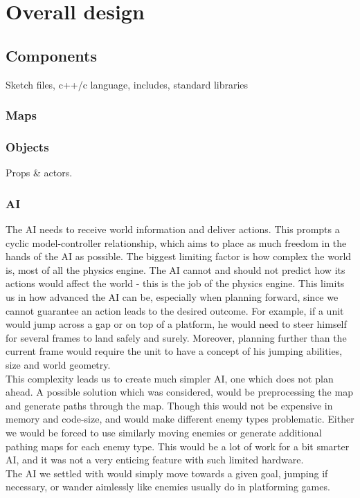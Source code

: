 \chapter{Overall design}

\section{Components}
Sketch files, c++/c language, includes, standard libraries

\subsection{Maps}


\subsection{Objects}
Props \& actors.

\subsection{AI} %
The AI needs to receive world information and deliver actions. This prompts a cyclic model-controller relationship, which aims to place as much freedom in the hands of the AI as possible. The biggest limiting factor is how complex the world is, most of all the physics engine. The AI cannot and should not predict how its actions would affect the world - this is the job of the physics engine. This limits us in how advanced the AI can be, especially when planning forward, since we cannot guarantee an action leads to the desired outcome. For example, if a unit would jump across a gap or on top of a platform, he would need to steer himself for several frames to land safely and surely. Moreover, planning further than the current frame would require the unit to have a concept of his jumping abilities, size and world geometry.\\
This complexity leads us to create much simpler AI, one which does not plan ahead. A possible solution which was considered, would be preprocessing the map and generate paths through the map. Though this would not be expensive in memory and code-size, and would make different enemy types problematic. Either we would be forced to use similarly moving enemies or generate additional pathing maps for each enemy type. This would be a lot of work for a bit smarter AI, and it was not a very enticing feature with such limited hardware.\\
The AI we settled with would simply move towards a given goal, jumping if necessary, or wander aimlessly like enemies usually do in platforming games.

